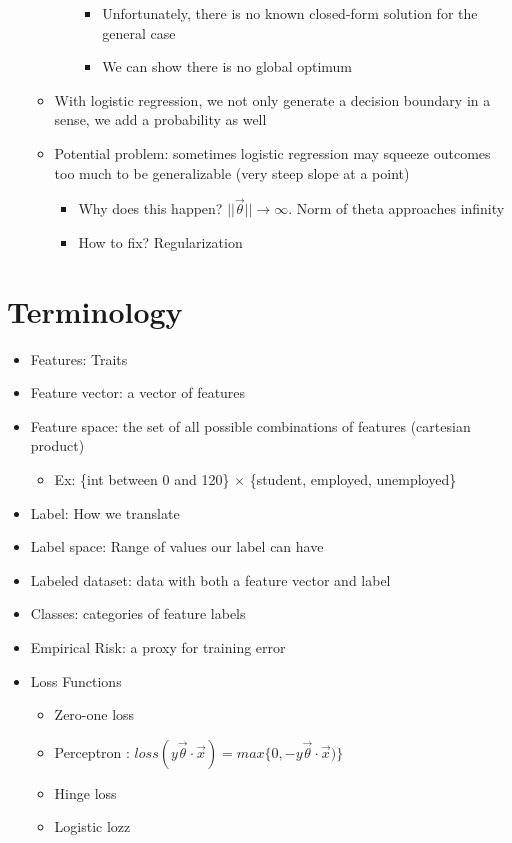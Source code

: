 \documentclass[10pt, oneside]{article}
\begin{document}
\begin{itemize}
\begin{itemize}
\begin{itemize}
\begin{itemize}
               \item Unfortunately, there is no known closed-form solution for the general case
               \item We can show there is no global optimum
           \end{itemize}
       \end{itemize}
       \item With logistic regression, we not only generate a decision boundary in a sense, we add a probability as well
       \item Potential problem: sometimes logistic regression may squeeze outcomes too much to be generalizable (very steep slope at a point)
       \begin{itemize}
           \item Why does this happen? $||\vec \theta|| \rightarrow \infty$. Norm of theta approaches infinity
           \item How to fix? Regularization
       \end{itemize}
    \end{itemize}
\end{itemize}

\section{Terminology}
\begin{itemize}
    \item Features: Traits
    \item Feature vector: a vector of features
    \item Feature space: the set of all possible combinations of features (cartesian product)
    \begin{itemize}
        \item Ex: \{int between 0 and 120\} $\times$ \{student, employed, unemployed\}
    \end{itemize}
    \item Label: How we translate
    \item Label space: Range of values our label can have
    \item Labeled dataset: data with both a feature vector and label
    \item Classes: categories of feature labels
    \item Empirical Risk: a proxy for training error
    \item Loss Functions
    \begin{itemize}
        \item Zero-one loss
        \item Perceptron : $loss(y\vec\theta \cdot \vec x) =max \{0, -y \vec \theta \cdot \vec x)\}$
        \item Hinge loss
        \item Logistic lozz
    \end{itemize}
\end{itemize}
\end{document}
